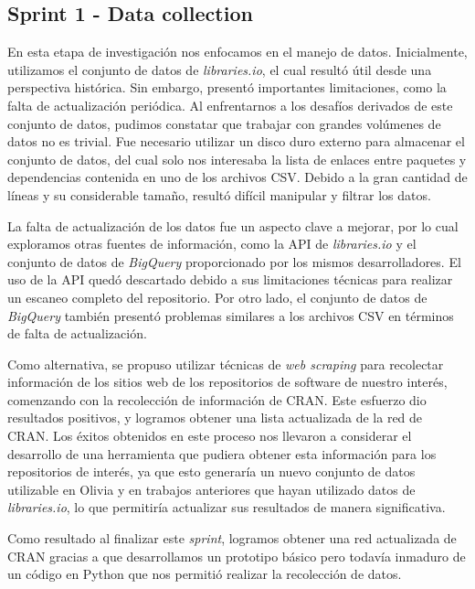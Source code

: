 \subsection{Sprint 1 - Data collection}

En esta etapa de investigación nos enfocamos en el manejo de datos. Inicialmente, utilizamos el conjunto de datos 
de \textit{libraries.io}, el cual resultó útil desde una perspectiva histórica. Sin embargo, presentó importantes 
limitaciones, como la falta de actualización periódica. Al enfrentarnos a los desafíos derivados de este conjunto 
de datos, pudimos constatar que trabajar con grandes volúmenes de datos no es trivial. Fue necesario utilizar un 
disco duro externo para almacenar el conjunto de datos, del cual solo nos interesaba la lista de enlaces entre 
paquetes y dependencias contenida en uno de los archivos CSV. Debido a la gran cantidad de líneas y su considerable 
tamaño, resultó difícil manipular y filtrar los datos.

La falta de actualización de los datos fue un aspecto clave a mejorar, por lo cual exploramos otras fuentes de información, 
como la API de \textit{libraries.io} y el conjunto de datos de \textit{BigQuery} proporcionado por los mismos desarrolladores. 
El uso de la API quedó descartado debido a sus limitaciones técnicas para realizar un escaneo completo del repositorio. 
Por otro lado, el conjunto de datos de \textit{BigQuery} también presentó problemas similares a los archivos CSV en 
términos de falta de actualización.

Como alternativa, se propuso utilizar técnicas de \textit{web scraping} para recolectar información de los sitios web 
de los repositorios de software de nuestro interés, comenzando con la recolección de información de CRAN. Este esfuerzo 
dio resultados positivos, y logramos obtener una lista actualizada de la red de CRAN. Los éxitos obtenidos en este 
proceso nos llevaron a considerar el desarrollo de una herramienta que pudiera obtener esta información para los 
repositorios de interés, ya que esto generaría un nuevo conjunto de datos utilizable en Olivia y en trabajos anteriores 
que hayan utilizado datos de \textit{libraries.io}, lo que permitiría actualizar sus resultados de manera significativa.

Como resultado al finalizar este \textit{sprint}, logramos obtener una red actualizada de CRAN gracias a que desarrollamos 
un prototipo básico pero todavía inmaduro de un código en Python que nos permitió realizar la recolección de datos.

